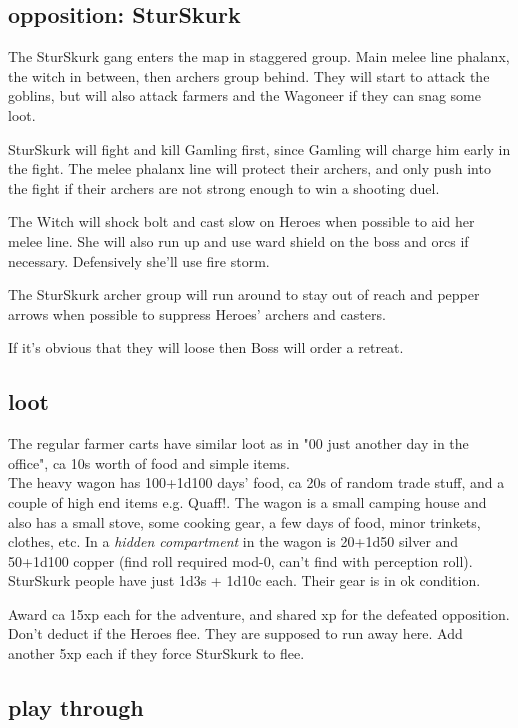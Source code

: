 \subsection*{opposition: SturSkurk}

The SturSkurk gang enters the map in staggered group. Main melee line phalanx, the witch in between, then archers group behind.
They will start to attack the goblins, but will also attack farmers and the Wagoneer if they can snag some loot.

SturSkurk will fight and kill Gamling first, since Gamling will charge him early in the fight. The melee phalanx line will protect their archers, and only push into the fight if their archers are not strong enough to win a shooting duel.

The Witch will shock bolt and cast slow on Heroes when possible to aid her melee line. She will also run up and use ward shield on the boss and orcs if necessary. Defensively she'll use fire storm.

The SturSkurk archer group will run around to stay out of reach and pepper arrows when possible to suppress Heroes' archers and casters.

If it's obvious that they will loose then Boss will order a retreat.


\subsection*{loot}

The regular farmer carts have similar loot as in "00 just another day in the office", ca 10s worth of food and simple items.\\
The heavy wagon has 100+1d100 days' food, ca 20s of random trade stuff, and a couple of high end items e.g. Quaff!. The wagon is a small camping house and also has a small stove, some cooking gear, a few days of food, minor trinkets, clothes, etc. In a \emph{hidden compartment} in the wagon is 20+1d50 silver and 50+1d100 copper (find roll required mod-0, can't find with perception roll).\\
SturSkurk people have just 1d3s + 1d10c each. Their gear is in ok condition.

Award ca 15xp each for the adventure, and shared xp for the defeated opposition. Don't deduct if the Heroes flee. They are supposed to run away here. Add another 5xp each if they force SturSkurk to flee.


\subsection*{play through}

